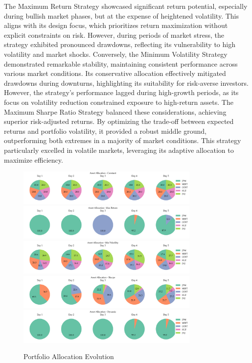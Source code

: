 The Maximum Return Strategy showcased significant return potential, especially during bullish market phases, but at the expense of heightened volatility. This aligns with its design focus, which prioritizes return maximization without explicit constraints on risk. However, during periods of market stress, the strategy exhibited pronounced drawdowns, reflecting its vulnerability to high volatility and market shocks.
Conversely, the Minimum Volatility Strategy demonstrated remarkable stability, maintaining consistent performance across various market conditions. Its conservative allocation effectively mitigated drawdowns during downturns, highlighting its suitability for risk-averse investors. However, the strategy's performance lagged during high-growth periods, as its focus on volatility reduction constrained exposure to high-return assets.
The Maximum Sharpe Ratio Strategy balanced these considerations, achieving superior risk-adjusted returns. By optimizing the trade-off between expected returns and portfolio volatility, it provided a robust middle ground, outperforming both extremes in a majority of market conditions. This strategy particularly excelled in volatile markets, leveraging its adaptive allocation to maximize efficiency.
\begin{figure}[htbp]
    \centering
    \includegraphics[width=0.8\textwidth]{figures/asset_allocations_constant.png}
    \includegraphics[width=0.8\textwidth]{figures/asset_allocations_max_return.png}
    \includegraphics[width=0.8\textwidth]{figures/asset_allocations_min_volatility.png}
    \includegraphics[width=0.8\textwidth]{figures/asset_allocations_sharpe.png}
    \includegraphics[width=0.8\textwidth]{figures/asset_allocations_dynamic.png}
    \caption{Portfolio Allocation Evolution}
    \label{fig:asset_allocations_evolution}
\end{figure}
